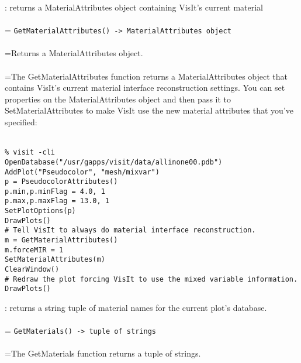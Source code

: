 \documentclass[10pt,a4paper]{report}
\begin{document}
{}
: returns a MaterialAttributes object containing VisIt's current material\\[-3mm]

 \\ 
\hangindent=\parindent 
\verb!GetMaterialAttributes() -> MaterialAttributes object!\\ [-3mm]

 \\ 
\hangindent=\parindent Returns a MaterialAttributes object. \\[-3mm] 

 \\ 
\hangindent=\parindent The GetMaterialAttributes function returns a MaterialAttributes object that contains VisIt's current material interface reconstruction settings. You can set properties on the MaterialAttributes object and then pass it to SetMaterialAttributes to make VisIt use the new material attributes that you've specified: \\[-3mm] 

\\[-6mm]
\begin{verbatim}% visit -cli
OpenDatabase("/usr/gapps/visit/data/allinone00.pdb")
AddPlot("Pseudocolor", "mesh/mixvar")
p = PseudocolorAttributes()
p.min,p.minFlag = 4.0, 1
p.max,p.maxFlag = 13.0, 1
SetPlotOptions(p)
DrawPlots()
# Tell VisIt to always do material interface reconstruction.
m = GetMaterialAttributes()
m.forceMIR = 1
SetMaterialAttributes(m)
ClearWindow()
# Redraw the plot forcing VisIt to use the mixed variable information.
DrawPlots()
\end{verbatim}
\newpage


{}
: returns a string tuple of material names for the current plot's database.\\[-3mm]

 \\ 
\hangindent=\parindent 
\verb!GetMaterials() -> tuple of strings!\\ [-3mm]

 \\ 
\hangindent=\parindent The GetMaterials function returns a tuple of strings. \\[-3mm] 
\end{document}
